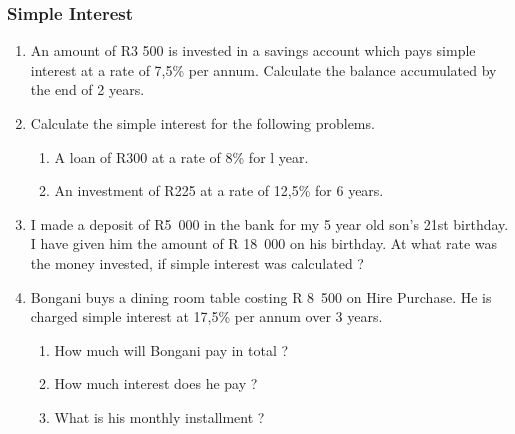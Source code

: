 \label{m39332*secfhsst!!!underscore!!!id1753}
            \subsubsection{ Simple Interest }
            \nopagebreak
            \label{m39332*id71818}\begin{enumerate}[noitemsep, label=\textbf{\arabic*}. ] 
            \label{m39332*uid49}\item An amount of R3 500 is invested in a savings account which pays simple interest at a rate of 7,5\% per annum. Calculate the balance accumulated by the end of 2 years.\newline
    
        
\label{m39332*uid50}\item Calculate the simple interest for the following problems.
\label{m39332*id71847}\begin{enumerate}[noitemsep, label=\textbf{\alph*}. ] 
            \label{m39332*uid51}\item A loan of R300 at a rate of 8\% for l year.
\label{m39332*uid52}\item An investment of R225 at a rate of 12,5\% for 6 years.
\end{enumerate}
                
\label{m39332*uid53}\item I made a deposit of R5~000 in the bank for my 5 year old son's 21st birthday. I have given him the amount of R 18~000 on his birthday. At what rate was the money invested, if simple interest was calculated ?\newline
    
        
\label{m39332*uid54}\item Bongani buys a dining room table costing R 8~500 on Hire Purchase. He is charged simple interest at 17,5\% per annum over 3 years.
\label{m39332*id71906}\begin{enumerate}[noitemsep, label=\textbf{\alph*}. ] 
            \label{m39332*uid55}\item How much will Bongani pay in total ?
\label{m39332*uid56}\item How much interest does he pay ?
\label{m39332*uid57}\item What is his monthly installment ?
\end{enumerate}
        
        
\end{enumerate}
        
        

